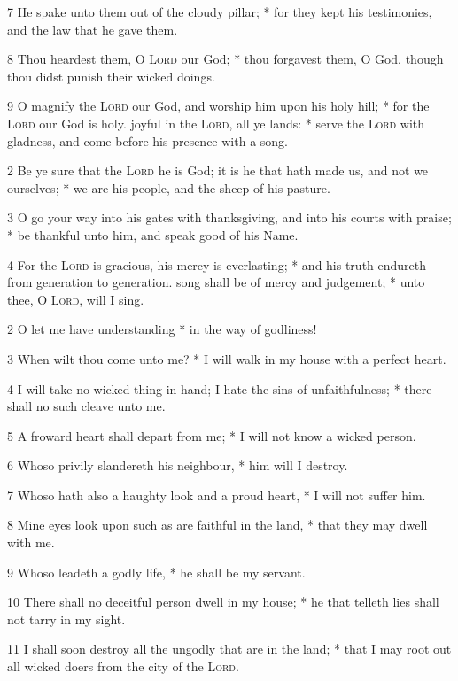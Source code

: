 7 He spake unto them out of the cloudy pillar; * for they kept his testimonies, and the law that he gave them.\par
8 Thou heardest them, O \textsc{Lord} our God; * thou forgavest them, O God, though thou didst punish their wicked doings.\par
9 O magnify the {\textsc{Lord}} our God, and worship him upon his holy hill; * for the {\textsc{Lord}} our God is holy.
 joyful in the {\textsc{Lord}}, all ye lands: * serve the {\textsc{Lord}} with gladness, and come before his presence with a song.\par
2 Be ye sure that the {\textsc{Lord}} he is God; it is he that hath made us, and not we ourselves; * we are his people, and the sheep of his pasture.\par
3 O go your way into his gates with thanksgiving, and into his courts with praise; * be thankful unto him, and speak good of his Name.\par
4 For the {\textsc{Lord}} is gracious, his mercy is everlasting; * and his truth endureth from generation to generation.
 song shall be of mercy and judgement; * unto thee, O {\textsc{Lord}}, will I sing.\par
2 O let me have understanding * in the way of godliness!\par
3 When wilt thou come unto me? * I will walk in my house with a perfect heart.\par
4 I will take no wicked thing in hand; I hate the sins of unfaithfulness; * there shall no such cleave unto me.\par
5 A froward heart shall depart from me; * I will not know a wicked person.\par
6 Whoso privily slandereth his neighbour, * him will I destroy.\par
7 Whoso hath also a haughty look and a proud heart, * I will not suffer him.\par
8 Mine eyes look upon such as are faithful in the land, * that they may dwell with me.\par
9 Whoso leadeth a godly life, * he shall be my servant.\par
10 There shall no deceitful person dwell in my house; * he that telleth lies shall not tarry in my sight.\par
11 I shall soon destroy all the ungodly that are in the land; * that I may root out all wicked doers from the city of the {\textsc{Lord}}.
